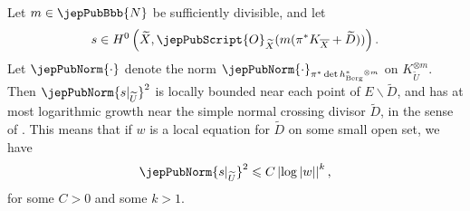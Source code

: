 \begin{lemma} \label{published:21} Let $m \in \jepPubBbb{N}$ be sufficiently divisible, and let 
$$s \in H^0 \left( \widetilde{X}, \jepPubScript{O}_{\widetilde{X}}(m (\pi^\ast K_{\overline{X}} + \widetilde{D})) \right).$$ 
Let $\jepPubNorm{ \cdot }$  denote the norm $\jepPubNorm{\cdot}_{\pi^\ast \det h_{\mathrm{Berg}}^\ast {}^{\otimes m}}$ on $K_{\widetilde{U}}^{\otimes m}$. Then $\jepPubNorm{s|_{\widetilde{U}}}^2$ is locally bounded near each point of $E \smallsetminus \widetilde{D}$, and has at most logarithmic growth near the simple normal crossing divisor $\widetilde{D}$, in the sense of \cite{pubref23}. This means that if $w$ is a local equation for $\widetilde{D}$ on some small open set, we have
$$
\jepPubNorm{s|_{\widetilde{U}}}^2 \leqslant C \left| \log |w| \right|^k,
$$
for some $C > 0$ and some $k > 1$.
\end{lemma}
